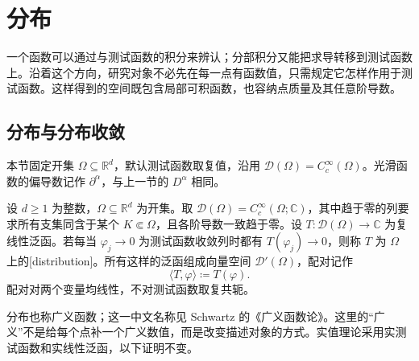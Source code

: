 \section{分布}
\label{b1:sec:2002}

一个函数可以通过与测试函数的积分来辨认；分部积分又能把求导转移到测试函数上。沿着这个方向，研究对象不必先在每一点有函数值，只需规定它怎样作用于测试函数。这样得到的空间既包含局部可积函数，也容纳点质量及其任意阶导数。


\subsection{分布与分布收敛}
\label{b1:subsec:200201}

本节固定开集 \(\Omega\subseteq\mathbb R^d\)，默认测试函数取复值，沿用 \(\mathcal D(\Omega)=C_c^\infty(\Omega)\)。光滑函数的偏导数记作 \(\partial^\alpha\)，与上一节的 \(D^\alpha\) 相同。

\begin{definition}\label{b1:def:distribution}
设 \(d\geq1\) 为整数，\(\Omega\subseteq\mathbb R^d\) 为开集。取 \(\mathcal D(\Omega)=C_c^\infty(\Omega;\mathbb C)\)，其中趋于零的列要求所有支集同含于某个 \(K\Subset\Omega\)，且各阶导数一致趋于零。设 \(T:\mathcal D(\Omega)\rightarrow\mathbb C\) 为复线性泛函。若每当 \(\varphi_j\rightarrow0\) 为测试函数收敛列时都有 \(T(\varphi_j)\rightarrow0\)，则称 \(T\) 为 \(\Omega\) 上的[distribution]。所有这样的泛函组成向量空间 \(\mathcal D'(\Omega)\)，配对记作
\[
 \langle T,\varphi\rangle\coloneqq T(\varphi).
\]
配对对两个变量均线性，不对测试函数取复共轭。
\end{definition}

分布也称广义函数；这一中文名称见 Schwartz 的《广义函数论》\cite[第一章]{Schwartz2010DistributionsChinese}。这里的“广义”不是给每个点补一个广义数值，而是改变描述对象的方式。实值理论采用实测试函数和实线性泛函，以下证明不变。

